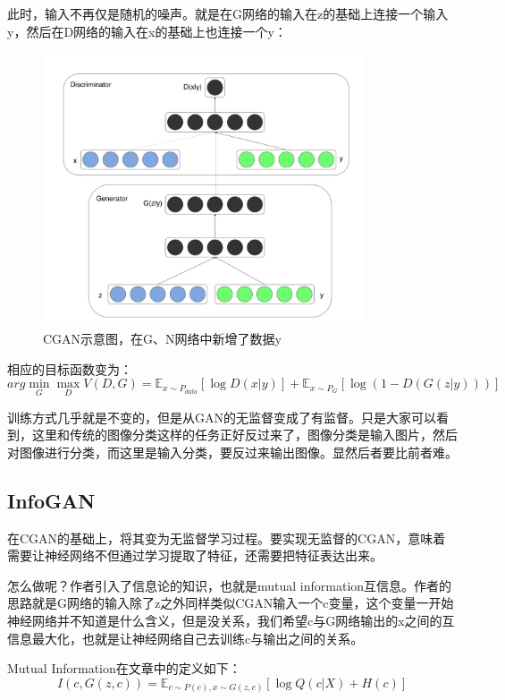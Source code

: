 此时，输入不再仅是随机的噪声。就是在G网络的输入在z的基础上连接一个输入y，然后在D网络的输入在x的基础上也连接一个y：
\begin{figure}[!hbtp]
\centering
\includegraphics[width=0.85\textwidth]{OpenSetRecognition/CGAN0.jpg}
\caption{CGAN示意图，在G、N网络中新增了数据y}
\label{CGAN0}
\end{figure}

相应的目标函数变为：
\begin{displaymath}
arg \min_G \max_D V(D, G) = \mathbb{E}_{x \sim P_{data}}\left[ \log D(x | y) \right] + \mathbb{E}_{x \sim P_G} \left[ \log (1 - D(G(z | y))) \right]
\end{displaymath}

训练方式几乎就是不变的，但是从GAN的无监督变成了有监督。只是大家可以看到，这里和传统的图像分类这样的任务正好反过来了，图像分类是输入图片，然后对图像进行分类，而这里是输入分类，要反过来输出图像。显然后者要比前者难。


\subsection{InfoGAN}

在CGAN的基础上，将其变为无监督学习过程。要实现无监督的CGAN，意味着需要让神经网络不但通过学习提取了特征，还需要把特征表达出来。

怎么做呢？作者引入了信息论的知识，也就是mutual information互信息。作者的思路就是G网络的输入除了z之外同样类似CGAN输入一个c变量，这个变量一开始神经网络并不知道是什么含义，但是没关系，我们希望c与G网络输出的x之间的互信息最大化，也就是让神经网络自己去训练c与输出之间的关系。

Mutual Information在文章中的定义如下：
\begin{displaymath}
I(c, G(z, c)) = \mathbb{E}_{c \sim P(c), x \sim G(z, c)} \left[ \log Q(c|X) + H(c) \right]
\end{displaymath}

